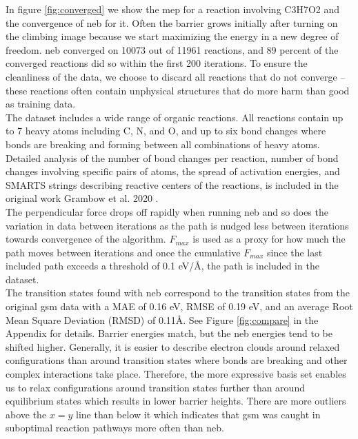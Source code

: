 \documentclass[twoside,twocolumn]{article}
\begin{document}
In figure \ref{fig:converged} we show the \gls{mep} for a reaction involving C3H7O2 and the convergence of \gls{neb} for it. Often the barrier grows initially after turning on the climbing image because we start maximizing the energy in a new degree of freedom. \gls{neb} converged on 10073 out of 11961 reactions, and 89 percent of the converged reactions did so within the first 200 iterations. To ensure the cleanliness of the data, we choose to discard all reactions that do not converge -- these reactions often contain unphysical structures that do more harm than good as training data. \\

The dataset includes a wide range of organic reactions. All reactions contain up to 7 heavy atoms including C, N, and O, and up to six bond changes where bonds are breaking and forming between all combinations of heavy atoms. Detailed analysis of the number of bond changes per reaction, number of bond changes involving specific pairs of atoms, the spread of activation energies, and SMARTS strings describing reactive centers of the reactions, is included in the original work Grambow et al. 2020 \cite{rxns}. \\

The perpendicular force drops off rapidly when running \gls{neb} and so does the variation in data between iterations as the path is nudged less between iterations towards convergence of the algorithm. $F_{max}$ is used as a proxy for how much the path moves between iterations and once the cumulative $F_{max}$ since the last included path exceeds a threshold of 0.1 eV/Å, the path is included in the dataset. \\

The transition states found with \gls{neb} correspond to the transition states from the original \gls{gsm} data with a MAE of 0.16 eV, RMSE of 0.19 eV, and an average Root Mean Square Deviation (RMSD) of 0.11Å. See Figure \ref{fig:compare} in the Appendix for details. Barrier energies match, but the \gls{neb} energies tend to be shifted higher. Generally, it is easier to describe electron clouds around relaxed configurations than around transition states where bonds are breaking and other complex interactions take place. Therefore, the more expressive basis set enables us to relax configurations around transition states further than around equilibrium states which results in lower barrier heights. There are more outliers above the $x=y$ line than below it which indicates that \gls{gsm} was caught in suboptimal reaction pathways more often than \gls{neb}.
\\
\end{document}
